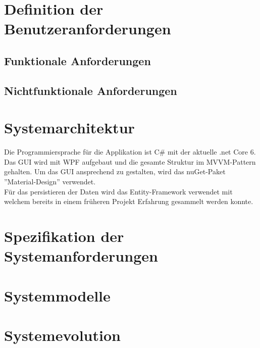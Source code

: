 

\newpage

\section{Definition der Benutzeranforderungen}

\subsection{Funktionale Anforderungen}



\subsection{Nichtfunktionale Anforderungen}



\newpage
\section{Systemarchitektur}
Die Programmiersprache für die Applikation ist C\# mit der aktuelle .net Core 6. Das GUI wird mit WPF aufgebaut und die gesamte Struktur im MVVM-Pattern gehalten. Um das GUI ansprechend zu gestalten, wird das nuGet-Paket ''Material-Design'' verwendet.\\
Für das persistieren der Daten wird das Entity-Framework verwendet mit welchem bereits in einem früheren Projekt Erfahrung gesammelt werden konnte. 

\section{Spezifikation der Systemanforderungen}
\section{Systemmodelle}
\section{Systemevolution}
